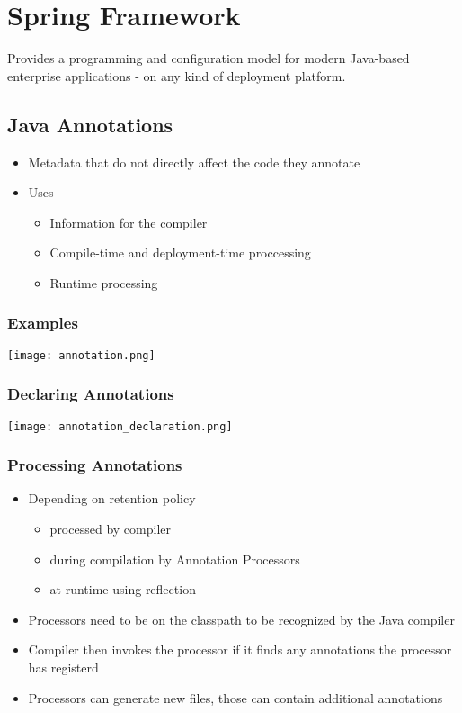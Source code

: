 \section{Spring Framework}
Provides a programming and configuration model for modern Java-based enterprise applications - on any kind of deployment platform.

\subsection{Java Annotations}
\begin{itemize}
    \item Metadata that do not directly affect the code they annotate
    \item Uses
    \begin{itemize}
        \item Information for the compiler
        \item Compile-time and deployment-time proccessing
        \item Runtime processing
    \end{itemize}
\end{itemize}
\subsubsection{Examples}
\texttt{[image: annotation.png]}
\subsubsection{Declaring Annotations}
\texttt{[image: annotation\_declaration.png]}
\subsubsection{Processing Annotations}
\begin{itemize}
    \item Depending on retention policy
    \begin{itemize}
        \item processed by compiler
        \item during compilation by Annotation Processors
        \item at runtime using reflection
    \end{itemize}
    \item Processors need to be on the classpath to be recognized by the Java compiler
    \item Compiler then invokes the processor if it finds any annotations the processor has registerd
    \item Processors can generate new files, those can contain additional annotations
\end{itemize}

